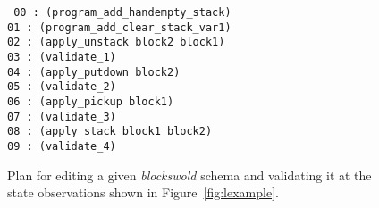 \documentclass{article}
\newcommand{\strips}{\textsc{Strips}}     %
\begin{document}

\begin{figure}
{\tt\small
00 : (program\_add\_handempty\_stack)\\
01 : (program\_add\_clear\_stack\_var1)\\
02 : (apply\_unstack block2 block1)\\
03 : (validate\_1)\\
04 : (apply\_putdown block2)\\
05 : (validate\_2)\\
06 : (apply\_pickup block1)\\
07 : (validate\_3)\\
08 : (apply\_stack block1 block2)\\
09 : (validate\_4)\\     
}
 \caption{\small Plan for editing a given {\em blockswold} schema and validating it at the state observations shown in Figure~\ref{fig:lexample}.}
\label{fig:plan}
\end{figure}
\end{document}
